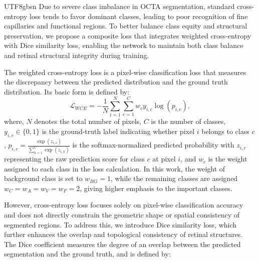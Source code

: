 \documentclass[times, review, 10pt]{elsarticle}
\begin{document}
\begin{CJK}{UTF8}{gbsn}
Due to severe class imbalance in OCTA segmentation, standard cross-entropy loss tends to favor dominant classes, leading to poor recognition of fine capillaries and functional regions. To better balance class equity and structural preservation, we propose a composite loss that integrates weighted cross-entropy with Dice similarity loss, enabling the network to maintain both class balance and retinal structural integrity during training.
\par
The weighted cross-entropy loss is a pixel-wise classification loss that measures the discrepancy between the predicted distribution and the ground truth distribution. Its basic form is defined by:
\begin{equation}
\mathcal{L}_{WCE}=-\frac1N\sum_{i=1}^N\sum_{c=1}^Cw_cy_{i,c}\log(p_{i,c}),
\end{equation}
where, $N$ denotes the total number of pixels, $C$ is the number of classes, $y_{i,c}\in\{0,1\}$ is the ground-truth label indicating whether pixel $i$ belongs to class $c$, $p_{i,c}=\frac{\exp(z_{i,c})}{\sum_{k=1}^{C} \exp(z_{i,k})}$ is the softmax-normalized predicted probability with $z_{i,c}$ representing the raw prediction score for class $c$ at pixel $i$, and $w_c$ is the weight assigned to each class in the loss calculation. In this work, the weight of background class is set to $w_{BG}=1$, while the remaining classes are assigned $w_C = w_A = w_V = w_F = 2$, giving higher emphasis to the important classes.
\par
However, cross-entropy loss focuses solely on pixel-wise classification accuracy and does not directly constrain the geometric shape or spatial consistency of segmented regions. To address this, we introduce Dice similarity loss, which further enhances the overlap and topological consistency of retinal structures. The Dice coefficient measures the degree of an overlap between the predicted segmentation and the ground truth, and is defined by:

\end{CJK}
\end{document}

